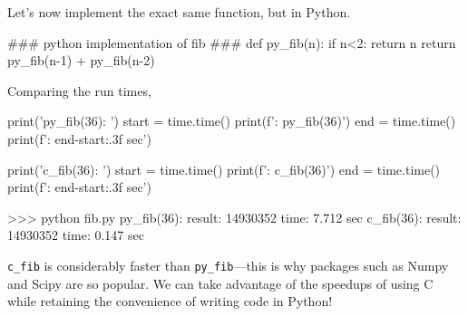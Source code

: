 \documentclass[12pt]{article}
\numberwithin{equation}{section}
\begin{document}
Let's now implement the exact same function, but in Python.

\begin{python}
	### python implementation of fib ###
	def py_fib(n):
	    if n<2:
	        return n
	    return py_fib(n-1) + py_fib(n-2)
	
\end{python}
Comparing the run times,
\begin{python}
	print('py_fib(36): ')
	start = time.time()
	print(f'\tresult: {py_fib(36)}')
	end = time.time()
	print(f'\ttime: {end-start:.3f} sec')
	
	print('c_fib(36): ')
	start = time.time()
	print(f'\tresult: {c_fib(36)}')
	end = time.time()
	print(f'\ttime: {end-start:.3f} sec')
	
	>>> python fib.py
	py_fib(36): 
	    result: 14930352
	    time: 7.712 sec
	c_fib(36): 
	    result: 14930352
	    time: 0.147 sec
\end{python}
  
\verb|c_fib| is considerably faster than \verb|py_fib|---this is why packages such as Numpy and Scipy are so popular. We can take advantage of the speedups of using C while retaining the convenience of writing code in Python!
	
\end{document}
